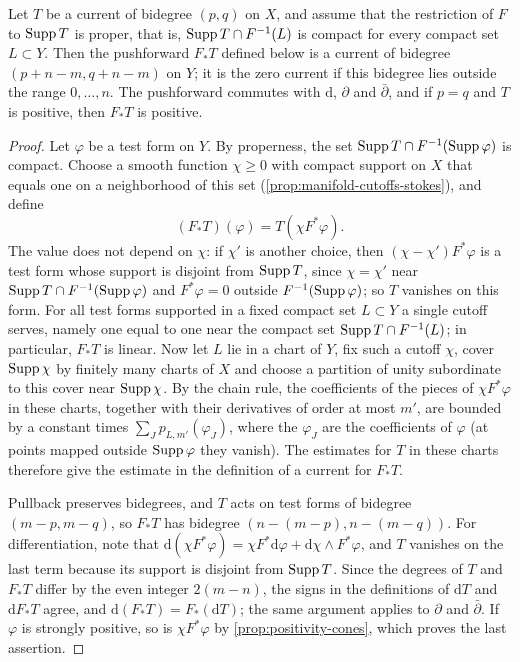 \begin{proposition}\label{prop:proper-current-pushforward}
Let $T$ be a current of bidegree $(p,q)$ on $X$, and assume that the restriction of $F$ to $\operatorname{Supp} T$ is proper, that is, $\operatorname{Supp} T\cap F^{-1}(L)$ is compact for every compact set $L\subset Y$. Then the pushforward $F_*T$ defined below is a current of bidegree $(p+n-m,q+n-m)$ on $Y$; it is the zero current if this bidegree lies outside the range $0,\ldots,n$. The pushforward commutes with $\mathrm{d}$, $\partial$ and $\bar\partial$, and if $p=q$ and $T$ is positive, then $F_*T$ is positive.
\end{proposition}
\begin{proof}
Let $\varphi$ be a test form on $Y$. By properness, the set $\operatorname{Supp} T\cap F^{-1}(\operatorname{Supp}\varphi)$ is compact. Choose a smooth function $\chi\geq0$ with compact support on $X$ that equals one on a neighborhood of this set (\cref{prop:manifold-cutoffs-stokes}), and define
\[
 (F_*T)(\varphi)=T(\chi F^*\varphi).
\]
The value does not depend on $\chi$: if $\chi'$ is another choice, then $(\chi-\chi')F^*\varphi$ is a test form whose support is disjoint from $\operatorname{Supp} T$, since $\chi=\chi'$ near $\operatorname{Supp} T\cap F^{-1}(\operatorname{Supp}\varphi)$ and $F^*\varphi=0$ outside $F^{-1}(\operatorname{Supp}\varphi)$; so $T$ vanishes on this form. For all test forms supported in a fixed compact set $L\subset Y$ a single cutoff serves, namely one equal to one near the compact set $\operatorname{Supp} T\cap F^{-1}(L)$; in particular, $F_*T$ is linear. Now let $L$ lie in a chart of $Y$, fix such a cutoff $\chi$, cover $\operatorname{Supp}\chi$ by finitely many charts of $X$ and choose a partition of unity subordinate to this cover near $\operatorname{Supp}\chi$. By the chain rule, the coefficients of the pieces of $\chi F^*\varphi$ in these charts, together with their derivatives of order at most $m'$, are bounded by a constant times $\sum_Jp_{L,m'}(\varphi_J)$, where the $\varphi_J$ are the coefficients of $\varphi$ (at points mapped outside $\operatorname{Supp}\varphi$ they vanish). The estimates for $T$ in these charts therefore give the estimate in the definition of a current for $F_*T$.

Pullback preserves bidegrees, and $T$ acts on test forms of bidegree $(m-p,m-q)$, so $F_*T$ has bidegree $(n-(m-p),n-(m-q))$. For differentiation, note that $\mathrm d(\chi F^*\varphi)=\chi F^*\mathrm d\varphi+\mathrm d\chi\wedge F^*\varphi$, and $T$ vanishes on the last term because its support is disjoint from $\operatorname{Supp} T$. Since the degrees of $T$ and $F_*T$ differ by the even integer $2(m-n)$, the signs in the definitions of $\mathrm dT$ and $\mathrm dF_*T$ agree, and $\mathrm d(F_*T)=F_*(\mathrm dT)$; the same argument applies to $\partial$ and $\bar\partial$. If $\varphi$ is strongly positive, so is $\chi F^*\varphi$ by \cref{prop:positivity-cones}, which proves the last assertion.
\end{proof}

